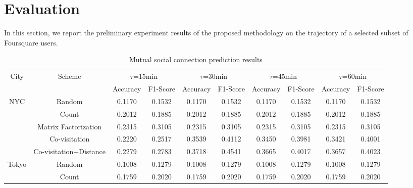 \section{Evaluation} \label{sec:evaluation}

In this section, we report the preliminary experiment results of the proposed methodology on the trajectory of a selected subset of Foursquare users.


\begin{table*}[]
\centering
\caption{Mutual social connection prediction results}
\label{T1}
\begin{tabular}{|c|c|c|c|c|c|c|c|c|c|}
\hline
\multirow{2}{*}{City}  & \multirow{2}{*}{Scheme} & \multicolumn{2}{c|}{$\tau$=15min} & \multicolumn{2}{c|}{$\tau$=30min} & \multicolumn{2}{c|}{$\tau$=45min} & \multicolumn{2}{c|}{$\tau$=60min} \\ \cline{3-10} 
                       &                         & Accuracy      & F1-Score     & Accuracy      & F1-Score     & Accuracy      & F1-Score     & Accuracy      & F1-Score     \\ \hline
\multirow{5}{*}{NYC}   & Random                  & 0.1170        & 0.1532       & 0.1170        & 0.1532       & 0.1170        & 0.1532       & 0.1170        & 0.1532       \\ \cline{2-10} 
                       & Count                   & 0.2012        & 0.1885       & 0.2012        & 0.1885       & 0.2012        & 0.1885       & 0.2012        & 0.1885       \\ \cline{2-10} 
                       & Matrix Factorization    & 0.2315        & 0.3105       & 0.2315        & 0.3105       & 0.2315        & 0.3105       & 0.2315        & 0.3105       \\ \cline{2-10} 
                       & Co-visitation           & 0.2220        & 0.2517       & 0.3539        & 0.4112       & 0.3450        & 0.3981       & 0.3421        & 0.4001       \\ \cline{2-10} 
                       & Co-visitation+Distance  & 0.2279        & 0.2783       & 0.3718        & 0.4541       & 0.3665        & 0.4017       & 0.3657        & 0.4023       \\ \hline
\multirow{5}{*}{Tokyo} & Random                  & 0.1008        & 0.1279       & 0.1008        & 0.1279       & 0.1008        & 0.1279       & 0.1008        & 0.1279       \\ \cline{2-10} 
                       & Count                   & 0.1759        & 0.2020       & 0.1759        & 0.2020       & 0.1759        & 0.2020       & 0.1759        & 0.2020       \\ \cline{2-10} 

\end{tabular}
\end{table*}
